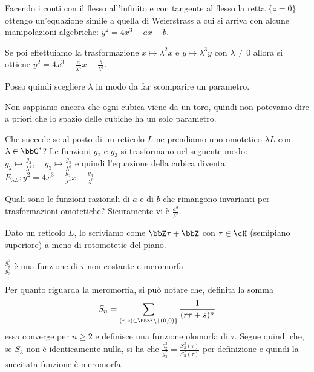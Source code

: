 Facendo i conti con il flesso all'infinito e con tangente al flesso la
retta $\{ z = 0 \}$ ottengo un'equazione simile a quella di Weierstrass
a cui si arriva con alcune manipolazioni algebriche:
$y^2 = 4 x^3 - a x - b$.

Se poi effettuiamo la trasformazione $x \mapsto \lambda^2 x$ e $y
\mapsto \lambda^3 y$ con $\lambda \neq 0$ allora si ottiene $y^2 = 4 x^3
- \frac{a}{\lambda^4} x - \frac{b}{\lambda^6}$.

Posso quindi scegliere $\lambda$ in modo da far scomparire un parametro.

\begin{osservazione}
  Non sappiamo ancora che ogni cubica viene da un toro, quindi non
  potevamo dire a priori che lo spazio delle cubiche ha un solo
  parametro.
\end{osservazione}

Che succede se al posto di un reticolo $L$ ne prendiamo uno omotetico
$\lambda L$ con $\lambda \in \bbC^*$? Le funzioni $g_2$ e $g_3$ si
trasformano nel seguente modo:
$ g_2 \mapsto \frac{g_2}{\lambda^4} ,\quad g_3 \mapsto
\frac{g_3}{\lambda^6}$ e quindi l'equazione della cubica diventa:
$E_{\lambda L}: y^2 = 4x^3 - \frac{g_2}{\lambda^4} x -
\frac{g_3}{\lambda^6}$

Quali sono le funzioni razionali di $a$ e di $b$ che rimangono
invarianti per trasformazioni omotetiche? Sicuramente vi è
$\frac{a^3}{b^2}$.

Dato un reticolo $L$, lo scriviamo come $\bbZ \tau + \bbZ$ con $\tau \in
\cH$ (semipiano superiore) a meno di rotomotetie del piano.

\begin{proposizione}
  $\frac{g_2^3}{g_3^2}$ è una funzione di $\tau$ non costante e meromorfa
\end{proposizione}

Per quanto riguarda la meromorfia, si può notare che, definita la somma
$$S_n = \sum_{(r, s) \in \bbZ^2 \setminus \{(0, 0)\}} \frac{1}{(r \tau
  + s)^n}$$ essa converge per $n \ge 2$ e definisce una funzione olomorfa
di $\tau$. Segue quindi che, se $S_3$ non è identicamente nulla, si ha
che $\frac{g_2^3}{g_3^2} = \frac{S_2^3(\tau)}{S_3^2(\tau)}$ per
definizione e quindi la succitata funzione è meromorfa.


